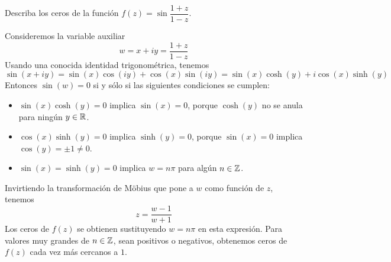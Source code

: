 \begin{exercise}
Describa los ceros de la función $f(z) = \sin \dfrac {1 + z} {1 - z}$.
\end{exercise}

\begin{solution}
Consideremos la variable auxiliar
$$w = x + iy = \frac {1 + z} {1 - z}$$
Usando una conocida identidad trigonométrica, tenemos
$$\sin(x + iy) = \sin(x) \cos(iy) + \cos(x) \sin(iy) = \sin(x) \cosh(y) + i \cos(x) \sinh(y)$$
Entonces $\sin(w) = 0$ si y sólo si las siguientes condiciones se cumplen:
\begin{itemize}
    \item $\sin(x) \cosh(y) = 0$ implica $\sin(x) = 0$, porque $\cosh(y)$ no se anula para ningún $y \in \mathbb R$.
    \item $\cos(x) \sinh(y) = 0$ implica $\sinh(y) = 0$, porque $\sin(x) = 0$ implica $\cos(y) = \pm 1 \ne 0$.
    \item $\sin(x) = \sinh(y) = 0$ implica $w = n\pi$ para algún $n \in \mathbb Z$.
\end{itemize}
Invirtiendo la transformación de Möbius que pone a $w$ como función de $z$, tenemos
$$z = \frac {w - 1} {w + 1}$$
Los ceros de $f(z)$ se obtienen sustituyendo $w = n\pi$ en esta expresión. Para valores muy grandes de $n \in \mathbb Z$, sean positivos o negativos, obtenemos ceros de $f(z)$ cada vez más cercanos a $1$.
\end{solution}

